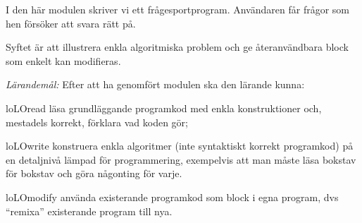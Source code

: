 
I den här modulen skriver vi ett frågesportprogram.
Användaren får frågor som hen försöker att svara rätt på.

Syftet är att illustrera enkla algoritmiska problem och ge återanvändbara block 
som enkelt kan modifieras.

\emph{Lärandemål:}
Efter att ha genomfört modulen ska den lärande kunna:
\begin{restatable}{lo}{LOread}
  läsa grundläggande programkod med enkla konstruktioner
    och, mestadels korrekt, förklara vad koden gör;
\end{restatable}
\begin{restatable}{lo}{LOwrite}
  konstruera enkla algoritmer (inte syntaktiskt korrekt programkod) på en 
  detaljnivå lämpad för programmering, exempelvis att man måste läsa bokstav 
  för bokstav och göra någonting för varje.
\end{restatable}
\begin{restatable}{lo}{LOmodify}
  använda existerande programkod som block i egna program, dvs \enquote{remixa} 
  existerande program till nya.
\end{restatable}
